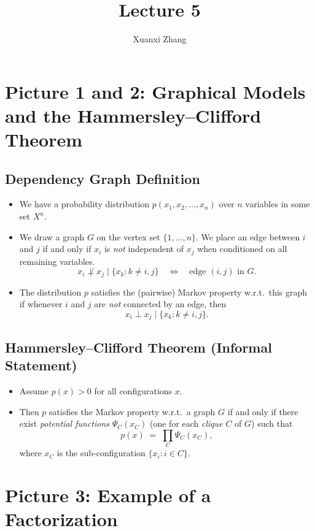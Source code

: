 \documentclass{article}%
\title{\huge Lecture 5\\
\normalsize}
\author{Xuanxi Zhang}
\begin{document}
\maketitle


\section{Picture 1 and 2: Graphical Models and the Hammersley--Clifford Theorem}

\subsection*{Dependency Graph Definition}
\begin{itemize}
    \item We have a probability distribution \(p(x_1, x_2, \dots, x_n)\) over \(n\) variables in some set \(X^n\).
    \item We draw a graph \(G\) on the vertex set \(\{1,\dots,n\}\). We place an edge between \(i\) and \(j\) if and only if \(x_i\) is \emph{not} independent of \(x_j\) when conditioned on all remaining variables. 
    \[
      x_i \not\perp x_j \;\Big|\;\{x_k : k \neq i,j\} \quad\Longleftrightarrow\quad \text{edge }(i,j)\text{ in }G.
    \]
    \item The distribution \(p\) satisfies the (pairwise) Markov property w.r.t.~this graph if whenever \(i\) and \(j\) are \emph{not} connected by an edge, then
    \[
      x_i \perp x_j \;\Big|\;\{x_k : k \neq i,j\}.
    \]
\end{itemize}

\subsection*{Hammersley--Clifford Theorem (Informal Statement)}
\begin{itemize}
    \item Assume \(p(x) > 0\) for all configurations \(x\).
    \item Then \(p\) satisfies the Markov property w.r.t.\ a graph \(G\) if and only if there exist \emph{potential functions} \(\Psi_C(x_C)\) (one for each \emph{clique} \(C\) of \(G\)) such that
    \[
        p(x) \;=\; \prod_{C} \Psi_C(x_C),
    \]
    where \(x_C\) is the sub‐configuration \(\{x_i : i \in C\}\).
\end{itemize}

\section{Picture 3: Example of a Factorization}
\end{document}
